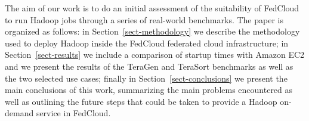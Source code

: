 %




The aim of our work is to do an initial assessment of the suitability of FedCloud to run Hadoop jobs through a series of real-world benchmarks. The paper is organized as follows: in Section~\ref{sect-methodology} we describe the methodology used to deploy Hadoop inside the FedCloud federated cloud infrastructure; in Section~\ref{sect-results} we include a comparison of startup times with Amazon EC2 and we present the results of the TeraGen and TeraSort benchmarks as well as the two selected use cases; finally in Section~\ref{sect-conclusions} we present the main conclusions of this work, summarizing the main problems encountered as well as outlining the future steps that could be taken to provide a Hadoop on-demand service in FedCloud.



